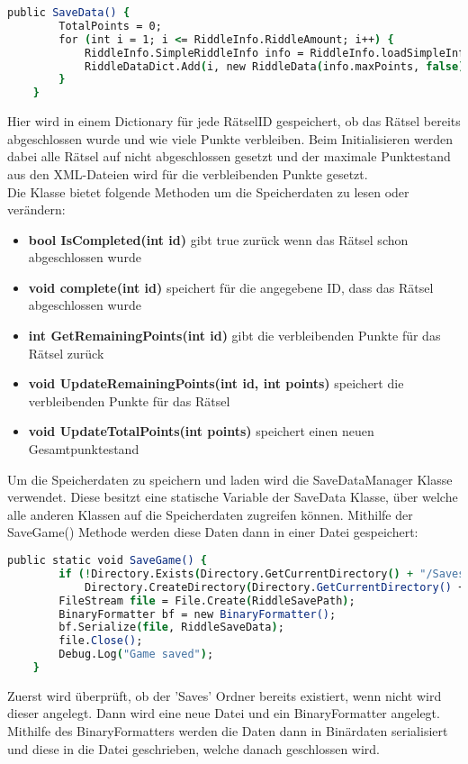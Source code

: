 {\begin{lstlisting}[language=csh, caption={Serialisierbare Speicherdaten für die Rätsel}]
    public SaveData() {
		TotalPoints = 0;
        for (int i = 1; i <= RiddleInfo.RiddleAmount; i++) {
            RiddleInfo.SimpleRiddleInfo info = RiddleInfo.loadSimpleInfoFromXML(i);
            RiddleDataDict.Add(i, new RiddleData(info.maxPoints, false));
        }
    }
\end{lstlisting}
Hier wird in einem Dictionary für jede RätselID gespeichert, ob das Rätsel bereits abgeschlossen wurde und wie viele Punkte verbleiben. Beim Initialisieren werden dabei alle Rätsel auf nicht abgeschlossen gesetzt und der maximale Punktestand aus den XML-Dateien wird für die verbleibenden Punkte gesetzt.\\
Die Klasse bietet folgende Methoden um die Speicherdaten zu lesen oder verändern:
\begin{itemize}
\item \textbf{bool IsCompleted(int id)} gibt true zurück wenn das Rätsel schon abgeschlossen wurde
\item \textbf{void complete(int id)} speichert für die angegebene ID, dass das Rätsel abgeschlossen wurde
\item \textbf{int GetRemainingPoints(int id)} gibt die verbleibenden Punkte für das Rätsel zurück
\item \textbf{void UpdateRemainingPoints(int id, int points)} speichert die verbleibenden Punkte für das Rätsel
\item \textbf{void UpdateTotalPoints(int points)} speichert einen neuen Gesamtpunktestand
\end{itemize}

Um die Speicherdaten zu speichern und laden wird die SaveDataManager Klasse verwendet.
Diese besitzt eine statische Variable der SaveData Klasse, über welche alle anderen Klassen auf die Speicherdaten zugreifen können. Mithilfe der SaveGame() Methode werden diese Daten dann in einer Datei gespeichert:
\begin{lstlisting}[language=csh, caption={Methode um SaveData in eine Datei zu speichern}]
public static void SaveGame() {
        if (!Directory.Exists(Directory.GetCurrentDirectory() + "/Saves"))
            Directory.CreateDirectory(Directory.GetCurrentDirectory() + "/Saves");
        FileStream file = File.Create(RiddleSavePath);
        BinaryFormatter bf = new BinaryFormatter();
        bf.Serialize(file, RiddleSaveData);
        file.Close();
        Debug.Log("Game saved");
    }
\end{lstlisting}
Zuerst wird überprüft, ob der 'Saves' Ordner bereits existiert, wenn nicht wird dieser angelegt. Dann wird eine neue Datei und ein BinaryFormatter angelegt. Mithilfe des BinaryFormatters werden die Daten dann in Binärdaten serialisiert und diese in die Datei geschrieben, welche danach geschlossen wird.\\

}
